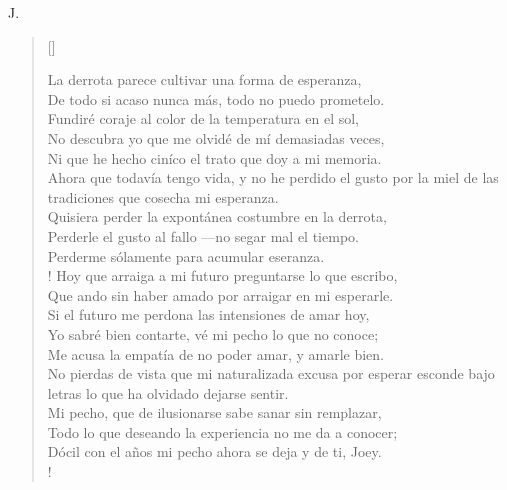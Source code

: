 \documentclass[11pt, a4paper]{article} %
\newcommand{\poemauthorright}[1]{\nopagebreak{\raggedleft\footnotesize\textsc{#1}\par}} %
\begin{document}
{ J}.


\poemtitle{}

\settowidth{\versewidth}{If you can meet with Triumph and Disaster} %

\begin{verse}[\versewidth]
{\scriptsize


La derrota parece cultivar una forma de esperanza, \\
De todo si acaso nunca más, todo no puedo prometelo. \\
Fundiré coraje al color de la temperatura en el sol, \\
No descubra yo que me olvidé de mí demasiadas veces, \\
Ni que he hecho ciníco el trato que doy a mi memoria. \\
Ahora que todavía tengo vida, y no he perdido el gusto por la miel de las tradiciones que cosecha mi esperanza. \\
Quisiera perder la expontánea costumbre en la derrota, \\
Perderle el gusto al fallo ---no segar mal el tiempo. \\
Perderme sólamente para acumular eseranza. \\!
Hoy que arraiga a mi futuro preguntarse lo que escribo, \\
Que ando sin haber amado por arraigar en mi esperarle. \\
Si el futuro me perdona las intensiones de amar hoy, \\
Yo sabré bien contarte, vé mi pecho lo que no conoce; \\  
Me acusa la empatía de no poder amar, y amarle bien. \\
No pierdas de vista que mi naturalizada excusa por esperar esconde bajo letras lo que ha olvidado dejarse sentir. \\
Mi pecho, que de ilusionarse sabe sanar sin remplazar, \\
Todo lo que deseando la experiencia no me da a conocer; \\
Dócil con el años mi pecho ahora se deja y de ti, Joey. \\!
}
\end{verse}


\poemauthorright{} %

\end{document}
